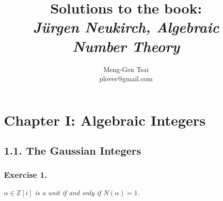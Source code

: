 \documentclass{article}
\title{\textbf{Solutions to the book: \\\emph{J\"{u}rgen Neukirch, Algebraic Number Theory}}}
\author{Meng-Gen Tsai \\ plover@gmail.com}
\begin{document}
\maketitle
\tableofcontents












\newpage
\section*{Chapter I: Algebraic Integers \\}



\subsection*{1.1. The Gaussian Integers \\}


\subsubsection*{Exercise 1.}
\emph{$\alpha \in \mathbb{Z}[i]$ is a unit if and only if $N(\alpha) = 1$.} \\
\end{document}
